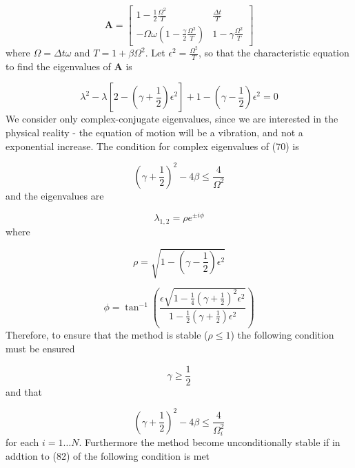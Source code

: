 \documentclass{article}
\begin{document}
				\begin{equation}
					\textbf{A} = \begin{bmatrix} 1 - \frac{1}{2} \frac{\Omega^2}{T} & \frac{\Delta t}{T}  \\
-\Omega \omega \left( 1 - \frac{\gamma}{2} \frac{\Omega^2}{T}\right)& 1 - \gamma \frac{\Omega^2}{T} \end{bmatrix}
				\end{equation}
where $\Omega = \Delta t \omega$ and $T = 1+\beta \Omega^2$. Let $\epsilon^2 = \frac{\Omega^2}{T}$, so that the characteristic equation to find the eigenvalues of $\textbf{A}$ is

				\begin{equation}
					\lambda^2 - \lambda \left[2 - (\gamma + \frac{1}{2})\epsilon^2\right] + 1 - (\gamma - \frac{1}{2})\epsilon^2 =0
				\end{equation}
We consider only complex-conjugate eigenvalues, since we are interested in the physical reality - the equation of motion will be a vibration, and not a exponential increase. The condition for complex eigenvalues of (70) is

				\begin{equation}
					(\gamma + \frac{1}{2})^2 - 4\beta \leq \frac{4}{\Omega^2}
				\end{equation}
and the eigenvalues are

				\begin{equation}
					\lambda_{1,2} = \rho e^{\pm i\phi}
				\end{equation}
where 

				\begin{equation*}
					\rho = \sqrt{1- (\gamma - \frac{1}{2})\epsilon^2}
				\end{equation*}
				
				\begin{equation*}
					\phi = \tan^{-1}\left( \frac{\epsilon \sqrt{1- \frac{1}{4}(\gamma + \frac{1}{2})^2\epsilon^2}}{1-\frac{1}{2}(\gamma +\frac{1}{2})\epsilon^2}\right)
				\end{equation*}
Therefore, to ensure that the method is stable ($\rho \leq 1$) the following condition must be ensured

				\begin{equation}
					\gamma \geq \frac{1}{2}
				\end{equation}
and that 

				\begin{equation}
					(\gamma + \frac{1}{2})^2 - 4\beta \leq \frac{4}{\Omega_i^2}
				\end{equation}
for each $i = 1 \dots N$. Furthermore the method become unconditionally stable if in addtion to (82) of the following condition is met
\end{document}
